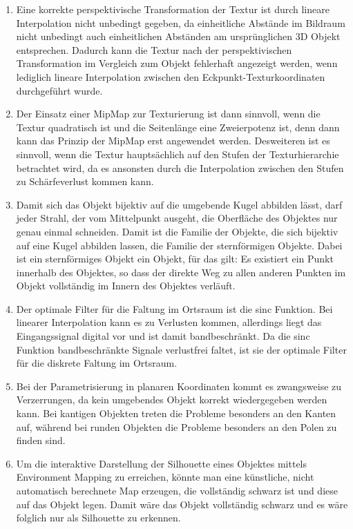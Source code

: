 \documentclass[a4paper,10pt]{scrartcl}
\begin{document}
 \begin{enumerate}[1.]
  \item Eine korrekte perspektivische Transformation der Textur ist durch lineare Interpolation nicht unbedingt gegeben, da einheitliche Abstände im Bildraum nicht unbedingt auch einheitlichen Abständen am ursprünglichen 3D Objekt entsprechen. Dadurch kann die Textur nach der perspektivischen Transformation im Vergleich zum Objekt fehlerhaft angezeigt werden, wenn lediglich lineare Interpolation zwischen den Eckpunkt-Texturkoordinaten durchgeführt wurde.

  \item Der Einsatz einer MipMap zur Texturierung ist dann sinnvoll, wenn die Textur quadratisch ist und die Seitenlänge eine Zweierpotenz ist, denn dann kann das Prinzip der MipMap erst angewendet werden. Desweiteren ist es sinnvoll, wenn die Textur hauptsächlich auf den Stufen der Texturhierarchie betrachtet wird, da es ansonsten durch die Interpolation zwischen den Stufen  zu Schärfeverlust kommen kann.

  \item Damit sich das Objekt bijektiv auf die umgebende Kugel abbilden lässt, darf jeder Strahl, der vom Mittelpunkt ausgeht, die Oberfläche des Objektes nur genau einmal schneiden. Damit ist die Familie der Objekte, die sich bijektiv auf eine Kugel abbilden lassen, die Familie der sternförmigen Objekte. Dabei ist ein sternförmiges Objekt ein Objekt, für das gilt: Es existiert ein Punkt innerhalb des Objektes, so dass der direkte Weg zu allen anderen Punkten im Objekt vollständig im Innern des Objektes verläuft.
 
  \item Der optimale Filter für die Faltung im Ortsraum ist die sinc Funktion. Bei linearer Interpolation kann es zu Verlusten kommen, allerdings liegt das Eingangssignal digital vor und ist damit bandbeschränkt. Da die sinc Funktion bandbeschränkte Signale verlustfrei faltet, ist sie der optimale Filter für die diskrete Faltung im Ortsraum.

  \item Bei der Parametrisierung in planaren Koordinaten kommt es zwangsweise zu Verzerrungen, da kein umgebendes Objekt korrekt wiedergegeben werden kann. Bei kantigen Objekten treten die Probleme besonders an den Kanten auf, während bei runden Objekten die Probleme besonders an den Polen zu finden sind.

  \item Um die interaktive Darstellung der Silhouette eines Objektes mittels Environment Mapping zu erreichen, könnte man eine künstliche, nicht automatisch berechnete Map erzeugen, die vollständig schwarz ist und diese auf das Objekt legen. Damit wäre das Objekt vollständig schwarz und es wäre folglich nur als Silhouette zu erkennen.

 \end{enumerate}
\end{document}
